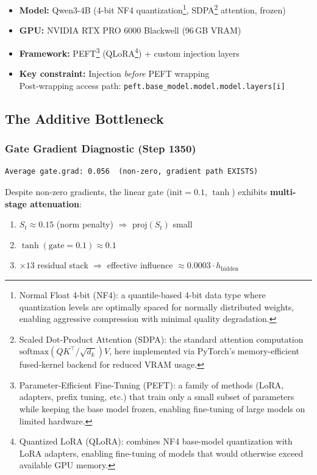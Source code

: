 \documentclass[11pt,a4paper]{article}
\begin{document}
\begin{itemize}
  \item \textbf{Model:} Qwen3-4B (4-bit NF4 quantization\footnote{Normal Float 4-bit (NF4): a quantile-based 4-bit data type where quantization levels are optimally spaced for normally distributed weights, enabling aggressive compression with minimal quality degradation.}, SDPA\footnote{Scaled Dot-Product Attention (SDPA): the standard attention computation $\mathrm{softmax}(QK^\top/\sqrt{d_k})V$, here implemented via PyTorch's memory-efficient fused-kernel backend for reduced VRAM usage.} attention, frozen)
  \item \textbf{GPU:} NVIDIA RTX PRO 6000 Blackwell (96\,GB VRAM)
  \item \textbf{Framework:} PEFT\footnote{Parameter-Efficient Fine-Tuning (PEFT): a family of methods (LoRA, adapters, prefix tuning, etc.) that train only a small subset of parameters while keeping the base model frozen, enabling fine-tuning of large models on limited hardware.} (QLoRA\footnote{Quantized LoRA (QLoRA): combines NF4 base-model quantization with LoRA adapters, enabling fine-tuning of models that would otherwise exceed available GPU memory.}) + custom injection layers
  \item \textbf{Key constraint:} Injection \emph{before} PEFT wrapping\\
    Post-wrapping access path: \texttt{peft.base\_model.model.model.layers[i]}
\end{itemize}

\subsection{The Additive Bottleneck}

\subsubsection*{Gate Gradient Diagnostic (Step 1350)}

\begin{lstlisting}
Average gate.grad: 0.056  (non-zero, gradient path EXISTS)
\end{lstlisting}

Despite non-zero gradients, the linear gate ($\text{init}=0.1$, $\tanh$) exhibits
\textbf{multi-stage attenuation}:

\begin{enumerate}
  \item $S_t \approx 0.15$ (norm penalty) $\Rightarrow$ $\mathrm{proj}(S_t)$ small
  \item $\tanh(\mathrm{gate}=0.1) \approx 0.1$
  \item $\times 13$ residual stack $\Rightarrow$ effective influence $\approx 0.0003 \cdot h_{\mathrm{hidden}}$
\end{enumerate}
\end{document}
